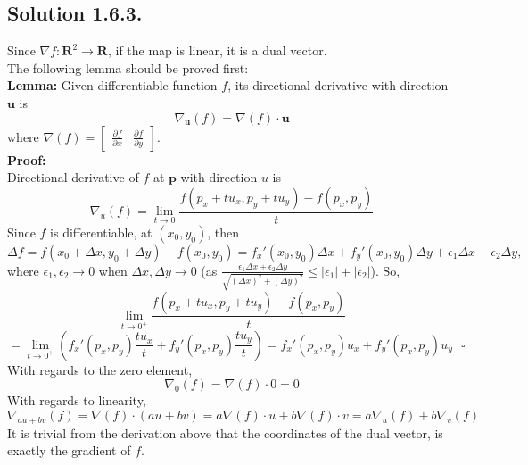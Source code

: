 \documentclass{article}
\begin{document}
\subsection*{Solution 1.6.3.}
Since $\nabla f: \mathbf{R} ^ 2 \to \mathbf{R}$, if the map is linear, it is a dual vector. \\
The following lemma should be proved first: \\
\textbf{Lemma:} Given differentiable function $f$, its directional derivative with direction $\mathbf{u}$ is
\[\nabla_{\mathbf{u}}(f) = \nabla(f) \cdot \mathbf{u}\]
where $\nabla(f) = [\begin{array}{rr}\frac{\partial f}{\partial x} & \frac{\partial f}{\partial y}\end{array}]$.\\
\textbf{Proof:}\\
Directional derivative of $f$ at $\mathbf{p}$ with direction $u$ is
\[\nabla_u(f) = \lim_{t\to 0}\frac{f(p_x + tu_x, p_y + tu_y) - f(p_x, p_y)}{t}\]
Since $f$ is differentiable, at $(x_0, y_0)$, then 
\[\Delta f = f(x_0 +\Delta x, y_0 + \Delta y) - f(x_0, y_0) = f_x'(x_0, y_0)\Delta x + f_y'(x_0, y_0)\Delta y + \epsilon_1\Delta x + \epsilon_2 \Delta y,\]
where $\epsilon_1, \epsilon_2 \to 0$ when $\Delta x, \Delta y \to 0$ (as $\frac{\epsilon_1 \Delta x + \epsilon_2 \Delta y}{\sqrt{(\Delta x) ^ 2 + (\Delta y) ^ 2}} \leq |\epsilon_1| + |\epsilon_2|$).
So, 
\[ \lim_{t\to 0 ^ +}\frac{f(p_x + tu_x, p_y + tu_y) - f(p_x, p_y)}{t}\]\[
=  \lim_{t\to 0 ^ +}\left(f_x'(p_x,p_y)\frac{tu_x}{t} + f_y'(p_x,p_y) \frac{tu_y}{t}\right) = f_x'(p_x,p_y)u_x+ f_y'(p_x,p_y)u_y \text{  } \square\]
With regards to the zero element, 
\[\nabla_0(f) = \nabla(f)\cdot 0 = 0\]
With regards to linearity,
\[\nabla_{au+bv}(f) = \nabla(f)\cdot(au+bv) = a\nabla(f)\cdot u + b\nabla(f)\cdot v = a \nabla_u(f) + b\nabla_v(f)\]
It is trivial from the derivation above that the coordinates of the dual vector, is exactly the gradient of $f$.
\end{document}
